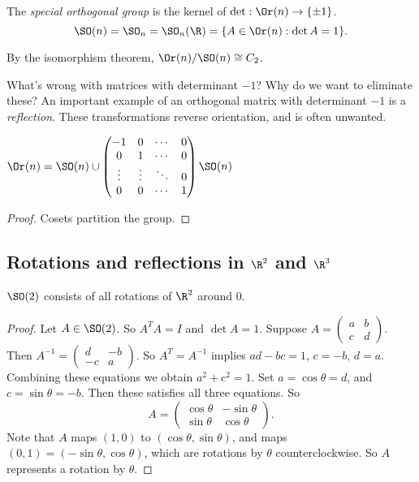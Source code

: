 \documentclass[a4paper]{article}
\begin{document}
\begin{defi}
  The \emph{special orthogonal group} is the kernel of $\det: \Or(n) \to \{\pm 1\}$.
  \[
    \SO(n) =\SO_n = \SO_n(\R) = \{A\in \Or(n): \det A = 1\}.
  \]
\end{defi}
By the isomorphism theorem, $\Or(n)/\SO(n) \cong C_2$.

What's wrong with matrices with determinant $-1$? Why do we want to eliminate these? An important example of an orthogonal matrix with determinant $-1$ is a \emph{reflection}. These transformations reverse orientation, and is often unwanted.

\begin{lemma}
  $\Or(n) = \SO(n) \cup
  \begin{pmatrix}
    -1 & 0 &\cdots & 0\\
    0 & 1 & \cdots & 0\\
    \vdots & \vdots & \ddots & 0\\
    0 & 0 & \cdots &1
  \end{pmatrix}\SO(n)$
\end{lemma}

\begin{proof}
  Cosets partition the group.
\end{proof}
\subsection{Rotations and reflections in \texorpdfstring{$\R^2$}{R2} and \texorpdfstring{$\R^3$}{R3}}
\begin{lemma}
  $\SO(2)$ consists of all rotations of $\R^2$ around 0.
\end{lemma}

\begin{proof}
  Let $A\in \SO(2)$. So $A^TA = I$ and $\det A = 1$. Suppose $A =
  \begin{pmatrix}
    a & b\\c & d
  \end{pmatrix}$. Then $A^{-1} =
  \begin{pmatrix}
    d & -b\\-c & a
  \end{pmatrix}.$ So $A^T = A^{-1}$ implies $ad - bc = 1$, $c = -b$, $d = a$. Combining these equations we obtain $a^2 + c^2 = 1$. Set $a = \cos\theta = d$, and $c = \sin\theta = -b$. Then these satisfies all three equations. So
  \[
    A =
    \begin{pmatrix}
      \cos\theta & -\sin\theta\\
      \sin\theta & \cos\theta
    \end{pmatrix}.
  \]
  Note that $A$ maps $(1, 0)$ to $(\cos\theta, \sin \theta)$, and maps $(0, 1)= (-\sin\theta, \cos\theta)$, which are rotations by $\theta$ counterclockwise. So $A$ represents a rotation by $\theta$.
\end{proof}
\end{document}
